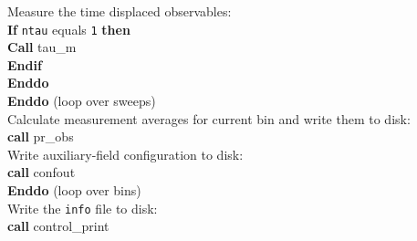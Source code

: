 \begin{mdframed}[frametitle={Structure of the main program \path{Prog/main.f90} of the auxiliary field QMC implementation:}]
{\hspace*{3em} Measure the time displaced observables: \\
\hspace*{3em} \textbf{If} \texttt{ntau} equals \texttt{1} \textbf{then}\\
\hspace*{4em} \textbf{Call} tau\_m\\
\hspace*{3em} \textbf{Endif}\\
\hspace*{2em} \textbf{Enddo}\\
\hspace*{1em} \textbf{Enddo} (loop over sweeps)\\
    
\hspace*{1em} Calculate measurement averages for current bin and write them to disk:\\
\hspace*{1em} \textbf{call} pr\_obs\\
\hspace*{1em} Write auxiliary-field configuration to disk: \\
\hspace*{1em} \textbf{call} confout\\
\textbf{Enddo} (loop over bins)\\

Write the \texttt{info} file to disk:\\
\textbf{call} control\_print
}
\end{mdframed}
% 
% 
% 
% 
% 
% 
% 
%    
%       
